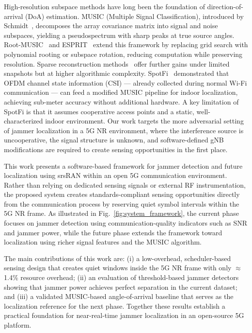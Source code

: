 \documentclass[conference]{IEEEtran}
\begin{document}
High-resolution subspace methods have long been the foundation of
direction-of-arrival (DoA) estimation. MUSIC (Multiple Signal
Classification), introduced by Schmidt~\cite{1143830}, decomposes the
array covariance matrix into signal and noise subspaces, yielding a
pseudospectrum with sharp peaks at true source angles. Root-MUSIC~\cite{45540}
and ESPRIT~\cite{32276} extend this framework by replacing grid search with
polynomial rooting or subspace rotation, reducing computation while
preserving resolution. Sparse reconstruction methods~\cite{inbook} offer
further gains under limited snapshots but at higher algorithmic complexity.
SpotFi~\cite{article} demonstrated that OFDM channel state information
(CSI) — already collected during normal Wi-Fi communication — can feed a
modified MUSIC pipeline for indoor localization, achieving sub-meter
accuracy without additional hardware. A key limitation of SpotFi is that
it assumes cooperative access points and a static, well-characterized
indoor environment. Our work targets the more adversarial setting of
jammer localization in a 5G NR environment, where the interference
source is uncooperative, the signal structure is unknown, and
software-defined gNB modifications are required to create sensing
opportunities in the first place.

This work presents a software-based framework for jammer detection and
future localization using srsRAN within an open 5G communication
environment. Rather than relying on dedicated sensing signals or external
RF instrumentation, the proposed system creates standards-compliant sensing
opportunities directly from the communication process by reserving quiet
symbol intervals within the 5G NR frame. As illustrated in
Fig.~\ref{fig:system_framework}, the current phase focuses on jammer
detection using communication-quality indicators such as SNR and jammer
power, while the future phase extends the framework toward localization
using richer signal features and the MUSIC algorithm.

The main contributions of this work are: (i) a low-overhead,
scheduler-based sensing design that creates quiet windows inside the 5G
NR frame with only $\approx$1.4\% resource overhead; (ii) an evaluation
of threshold-based jammer detectors showing that jammer power achieves
perfect separation in the current dataset; and (iii) a validated
MUSIC-based angle-of-arrival baseline that serves as the localization
reference for the next phase. Together these results establish a practical
foundation for near-real-time jammer localization in an open-source 5G
platform.
\end{document}
